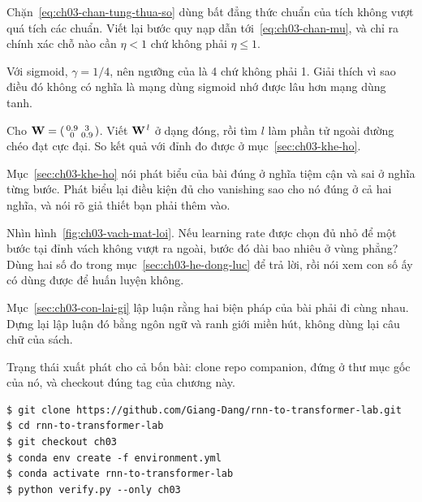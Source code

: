 \exercises

\tierunderstand

\begin{bt}
  \item Chặn~\eqref{eq:ch03-chan-tung-thua-so} dùng bất đẳng thức chuẩn của tích
    không vượt quá tích các chuẩn. Viết lại bước quy nạp dẫn
    tới~\eqref{eq:ch03-chan-mu}, và chỉ ra chính xác chỗ nào cần
    \(\eta < 1\) chứ không phải \(\eta \le 1\).

  \item Với sigmoid, \(\gamma = 1/4\), nên ngưỡng của  là 4 chứ
    không phải 1. Giải thích vì sao điều đó không có nghĩa là mạng dùng sigmoid
    nhớ được lâu hơn mạng dùng tanh.

  \item Cho \(\mathbf{W} = \begin{psmallmatrix} 0.9 & 3 \\ 0 & 0.9 \end{psmallmatrix}\).
    Viết \(\mathbf{W}^{\,l}\) ở dạng đóng, rồi tìm \(l\) làm phần tử ngoài đường
    chéo đạt cực đại. So kết quả với đỉnh đo được ở
    mục~\ref{sec:ch03-khe-ho}.

  \item Mục~\ref{sec:ch03-khe-ho} nói phát biểu của bài đúng ở nghĩa tiệm cận và
    sai ở nghĩa từng bước. Phát biểu lại điều kiện đủ cho vanishing sao cho nó
    đúng ở cả hai nghĩa, và nói rõ giả thiết bạn phải thêm vào.

  \item Nhìn hình~\ref{fig:ch03-vach-mat-loi}. Nếu learning rate được chọn đủ
    nhỏ để một bước tại đỉnh vách không vượt ra ngoài, bước đó dài bao nhiêu ở
    vùng phẳng? Dùng hai số đo trong mục~\ref{sec:ch03-he-dong-luc} để trả lời,
    rồi nói xem con số ấy có dùng được để huấn luyện không.

  \item Mục~\ref{sec:ch03-con-lai-gi} lập luận rằng hai biện pháp của bài phải
    đi cùng nhau. Dựng lại lập luận đó bằng ngôn ngữ  và ranh giới miền
    hút, không dùng lại câu chữ của sách.
\end{bt}

\tierapply

Trạng thái xuất phát cho cả bốn bài: clone repo companion, đứng ở thư mục gốc
của nó, và checkout đúng tag của chương này.

\begin{verbatim}
$ git clone https://github.com/Giang-Dang/rnn-to-transformer-lab.git
$ cd rnn-to-transformer-lab
$ git checkout ch03
$ conda env create -f environment.yml
$ conda activate rnn-to-transformer-lab
$ python verify.py --only ch03
\end{verbatim}

